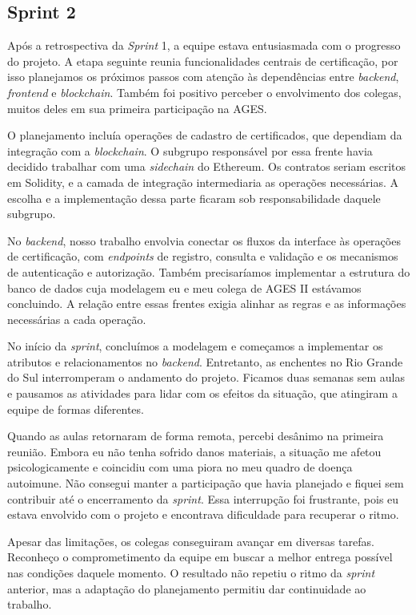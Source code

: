 \clearpage
\subsection{Sprint 2}

Após a retrospectiva da \textit{Sprint} 1, a equipe estava entusiasmada com o progresso do projeto. A etapa seguinte reunia funcionalidades centrais de certificação, por isso planejamos os próximos passos com atenção às dependências entre \textit{backend}, \textit{frontend} e \textit{blockchain}. Também foi positivo perceber o envolvimento dos colegas, muitos deles em sua primeira participação na \ac{AGES}.

O planejamento incluía operações de cadastro de certificados, que dependiam da integração com a \textit{blockchain}. O subgrupo responsável por essa frente havia decidido trabalhar com uma \textit{sidechain} do Ethereum. Os contratos seriam escritos em Solidity, e a camada de integração intermediaria as operações necessárias. A escolha e a implementação dessa parte ficaram sob responsabilidade daquele subgrupo.

No \textit{backend}, nosso trabalho envolvia conectar os fluxos da interface às operações de certificação, com \textit{endpoints} de registro, consulta e validação e os mecanismos de autenticação e autorização. Também precisaríamos implementar a estrutura do banco de dados cuja modelagem eu e meu colega de \ac{AGES} II estávamos concluindo. A relação entre essas frentes exigia alinhar as regras e as informações necessárias a cada operação.

No início da \textit{sprint}, concluímos a modelagem e começamos a implementar os atributos e relacionamentos no \textit{backend}. Entretanto, as enchentes no Rio Grande do Sul interromperam o andamento do projeto. Ficamos duas semanas sem aulas e pausamos as atividades para lidar com os efeitos da situação, que atingiram a equipe de formas diferentes.

Quando as aulas retornaram de forma remota, percebi desânimo na primeira reunião. Embora eu não tenha sofrido danos materiais, a situação me afetou psicologicamente e coincidiu com uma piora no meu quadro de doença autoimune. Não consegui manter a participação que havia planejado e fiquei sem contribuir até o encerramento da \textit{sprint}. Essa interrupção foi frustrante, pois eu estava envolvido com o projeto e encontrava dificuldade para recuperar o ritmo.

Apesar das limitações, os colegas conseguiram avançar em diversas tarefas. Reconheço o comprometimento da equipe em buscar a melhor entrega possível nas condições daquele momento. O resultado não repetiu o ritmo da \textit{sprint} anterior, mas a adaptação do planejamento permitiu dar continuidade ao trabalho.

